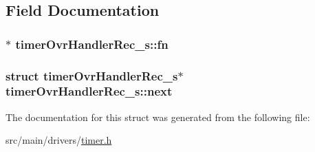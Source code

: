 \subsection{Field Documentation}
\hypertarget{structtimerOvrHandlerRec__s_a32b2ff008ebdc1a89e8638fe737519c7}{
\subsubsection[{fn}]{$\ast$ timer\+Ovr\+Handler\+Rec\+\_\+s\+::fn}}\label{structtimerOvrHandlerRec__s_a32b2ff008ebdc1a89e8638fe737519c7}
\hypertarget{structtimerOvrHandlerRec__s_a07f1f4a529c61a17b368e34aaac4f8bd}{
\subsubsection[{next}]{\setlength{\rightskip}{0pt plus 5cm}struct {\bf timer\+Ovr\+Handler\+Rec\+\_\+s}$\ast$ timer\+Ovr\+Handler\+Rec\+\_\+s\+::next}}\label{structtimerOvrHandlerRec__s_a07f1f4a529c61a17b368e34aaac4f8bd}


The documentation for this struct was generated from the following file\+:\begin{DoxyCompactItemize}
\item 
src/main/drivers/\hyperlink{timer_8h}{timer.\+h}\end{DoxyCompactItemize}
